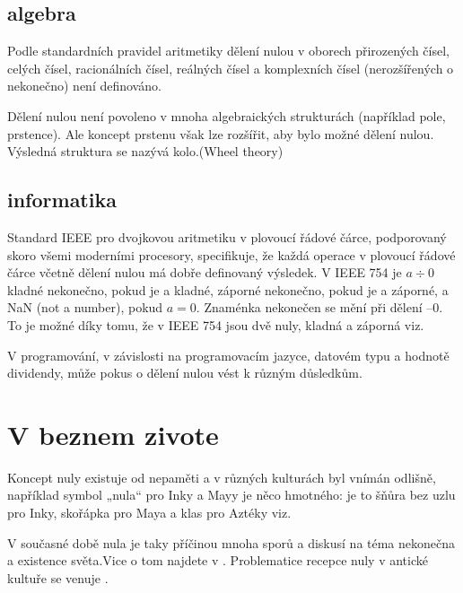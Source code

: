 \documentclass[a4paper, 11pt]{article}
\begin{document}
	\subsection{algebra}
	
	Podle standardních pravidel aritmetiky dělení nulou v oborech přirozených čísel, celých čísel, racionálních čísel, reálných čísel a komplexních čísel (nerozšířených o nekonečno) není definováno.
	
	Dělení nulou není povoleno v mnoha algebraických strukturách (například pole, prstence). Ale koncept prstenu však lze rozšířit, aby bylo možné dělení nulou. Výsledná struktura se nazývá kolo.(Wheel theory)


	\subsection{informatika}

    Standard IEEE pro dvojkovou aritmetiku v plovoucí řádové čárce, podporovaný skoro všemi moderními procesory, specifikuje, že každá operace v plovoucí řádové čárce včetně dělení nulou má dobře definovaný výsledek. V IEEE 754 je $a \div 0$ kladné nekonečno, pokud je a kladné, záporné nekonečno, pokud je a záporné, a NaN (not a number), pokud $a = 0$. Znaménka nekonečen se mění při dělení $–0$. To je možné díky tomu, že v IEEE 754 jsou dvě nuly, kladná a záporná viz. \cite{ieee8, ieee19}


    V programování, v závislosti na programovacím jazyce, datovém typu a hodnotě dividendy, může pokus o dělení nulou vést k různým důsledkům.
    
    \section{V beznem zivote}
    
    Koncept nuly existuje od nepaměti a v různých kulturách byl vnímán odlišně, například symbol „nula“ pro Inky a Mayy je něco hmotného: je to šňůra bez uzlu pro Inky, skořápka pro Maya a klas pro Aztéky viz. \cite{laurencich}
    
    V současné době nula je taky příčinou mnoha sporů a diskusí na téma nekonečna a existence světa.Vice o tom najdete v \cite{moskowitz, pavo}. Problematice recepce nuly v antické kultuře se venuje \cite{louchmanova}.

	\newpage
	
	\renewcommand{\refname}{Literatura}
	
	
\end{document}
